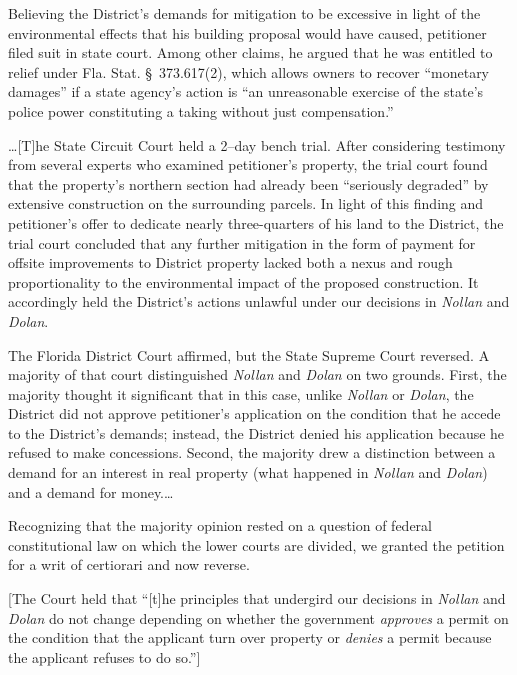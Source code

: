 Believing the District's demands for mitigation to be excessive in light of the
environmental effects that his building proposal would have caused, petitioner
filed suit in state court. Among other claims, he argued that he was entitled to
relief under Fla. Stat. \S~373.617(2), which allows owners to recover ``monetary
damages'' if a state agency's action is ``an unreasonable exercise of the
state's police power constituting a taking without just compensation.''



\ldots [T]he State Circuit Court held a 2--day bench trial. After considering
testimony from several experts who examined petitioner's property, the trial
court found that the property's northern section had already been ``seriously
degraded'' by extensive construction on the surrounding parcels. In light of
this finding and petitioner's offer to dedicate nearly three-quarters of his
land to the District, the trial court concluded that any further mitigation in
the form of payment for offsite improvements to District property lacked both a
nexus and rough proportionality to the environmental impact of the proposed
construction. It accordingly held the District's actions unlawful under our
decisions in \textit{Nollan} and \textit{Dolan}.

The Florida District Court affirmed, but the State Supreme Court reversed. A
majority of that court distinguished \textit{Nollan} and \textit{Dolan} on two
grounds. First, the majority thought it significant that in this case, unlike
\textit{Nollan} or \textit{Dolan}, the District did not approve petitioner's
application on the condition that he accede to the District's demands; instead,
the District denied his application because he refused to make concessions.
Second, the majority drew a distinction between a demand for an interest in real
property (what happened in \textit{Nollan} and \textit{Dolan}) and a demand for
money.\ldots

Recognizing that the majority opinion rested on a question of federal
constitutional law on which the lower courts are divided, we granted the
petition for a writ of certiorari and now reverse.



[The Court held that ``[t]he principles that undergird our decisions in
\textit{Nollan} and \textit{Dolan} do not change depending on whether the
government \textit{approves} a permit on the condition that the applicant turn
over property or \textit{denies} a permit because the applicant refuses to do
so.'']


